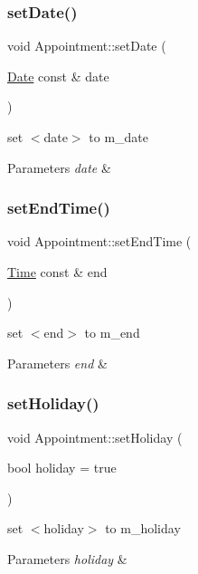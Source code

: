 \subsubsection{\texorpdfstring{set\+Date()}{setDate()}}
{\footnotesize\ttfamily void Appointment\+::set\+Date (\begin{DoxyParamCaption}\item[{\hyperlink{classDate}{Date} const \&}]{date }\end{DoxyParamCaption})}

set $<$date$>$ to m\+\_\+date 
\begin{DoxyParams}{Parameters}
{\em date} & \\
\hline
\end{DoxyParams}
\mbox{\label{classAppointment_a9e6455381eebacbaa3aa98ad3707baac}} 
\subsubsection{\texorpdfstring{set\+End\+Time()}{setEndTime()}}
{\footnotesize\ttfamily void Appointment\+::set\+End\+Time (\begin{DoxyParamCaption}\item[{\hyperlink{classTime}{Time} const \&}]{end }\end{DoxyParamCaption})}

set $<$end$>$ to m\+\_\+end 
\begin{DoxyParams}{Parameters}
{\em end} & \\
\hline
\end{DoxyParams}
\mbox{\label{classAppointment_acd825ab9b1d23efe1bc95dd440030094}} 
\subsubsection{\texorpdfstring{set\+Holiday()}{setHoliday()}}
{\footnotesize\ttfamily void Appointment\+::set\+Holiday (\begin{DoxyParamCaption}\item[{bool}]{holiday = {\ttfamily true} }\end{DoxyParamCaption})}

set $<$holiday$>$ to m\+\_\+holiday 
\begin{DoxyParams}{Parameters}
{\em holiday} & \\
\hline
\end{DoxyParams}
\mbox{\label{classAppointment_a65ff6f9a246d1bf437cb0be725841a84}} 
